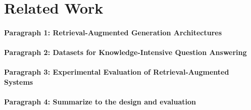 \section{Related Work} \label{sec:related_works}


\paragraph{Paragraph 1: Retrieval-Augmented Generation Architectures}

\paragraph{Paragraph 2: Datasets for Knowledge-Intensive Question Answering}

\paragraph{Paragraph 3: Experimental Evaluation of Retrieval-Augmented Systems}

\paragraph{Paragraph 4: Summarize to the design and evaluation}
